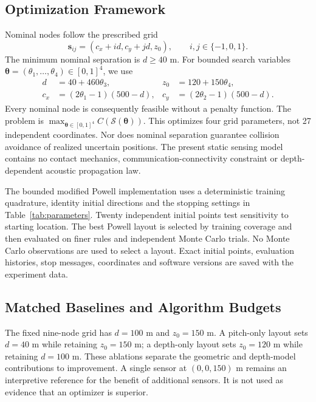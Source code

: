 \documentclass[fleqn,10pt]{wlscirep}
\begin{document}
\subsection*{Optimization Framework}
Nominal nodes follow the prescribed grid
\begin{equation}\label{eq:grid}
\mathbf s_{ij}=(c_x+i d,c_y+j d,z_0),\qquad i,j\in\{-1,0,1\}.
\end{equation}
The minimum nominal separation is $d\ge40$ m. For bounded search variables $\boldsymbol\theta=(\theta_1,\ldots,\theta_4)\in[0,1]^4$, we use
\begin{align}
d&=40+460\theta_3,&z_0&=120+150\theta_4,\nonumber\\
c_x&=(2\theta_1-1)(500-d),&c_y&=(2\theta_2-1)(500-d).\label{eq:parameterization}
\end{align}
Every nominal node is consequently feasible without a penalty function. The problem is $\max_{\boldsymbol\theta\in[0,1]^4}C(\mathcal S(\boldsymbol\theta))$. This optimizes four grid parameters, not 27 independent coordinates. Nor does nominal separation guarantee collision avoidance of realized uncertain positions. The present static sensing model contains no contact mechanics, communication-connectivity constraint or depth-dependent acoustic propagation law.

The bounded modified Powell implementation uses a deterministic training quadrature, identity initial directions and the stopping settings in Table~\ref{tab:parameters}. Twenty independent initial points test sensitivity to starting location. The best Powell layout is selected by training coverage and then evaluated on finer rules and independent Monte Carlo trials. No Monte Carlo observations are used to select a layout. Exact initial points, evaluation histories, stop messages, coordinates and software versions are saved with the experiment data.

\subsection*{Matched Baselines and Algorithm Budgets}
The fixed nine-node grid has $d=100$ m and $z_0=150$ m. A pitch-only layout sets $d=40$ m while retaining $z_0=150$ m; a depth-only layout sets $z_0=120$ m while retaining $d=100$ m. These ablations separate the geometric and depth-model contributions to improvement. A single sensor at $(0,0,150)$ m remains an interpretive reference for the benefit of additional sensors. It is not used as evidence that an optimizer is superior.
\end{document}
